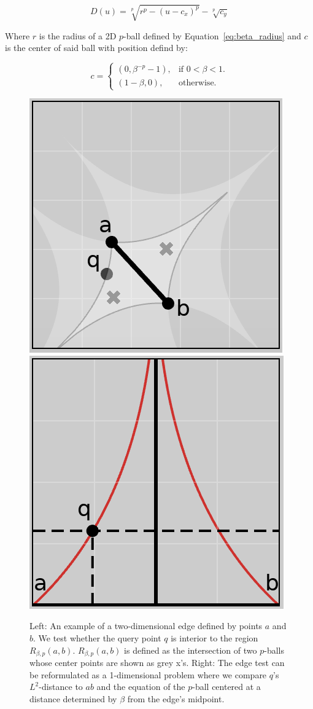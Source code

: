 \begin{equation}
    \label{eq:beta_parameterization}
    D(u) = \sqrt[p]{r^{p} - (u - c_x)^p} - \sqrt[p]{c_y}
\end{equation}

Where $r$ is the radius of a 2D $p$-ball defined by Equation~\ref{eq:beta_radius} and $c$ is the center of said ball with position defind by:

\begin{equation}
    c =
    \begin{cases}
        \left(0, \beta^{-p} - 1\right), & \text{if $0 < \beta < 1$}.\\
       \left(1-\beta, 0\right), & \text{otherwise}.
    \end{cases}
\end{equation}

\begin{figure}
    \includegraphics[width=0.48\linewidth]{figs/chap7/bskeleton.png}
    \includegraphics[width=0.48\linewidth]{figs/chap7/bskeletonParameter.png}
    \caption{Left: An example of a two-dimensional edge defined by points $a$ and $b$.
    We test whether the query point $q$ is interior to the region $R_{\beta,p}(a,b)$.
    $R_{\beta,p}(a,b)$ is defined as the intersection of two $p$-balls whose center points are shown as grey x's.
    Right: The edge test can be reformulated as a 1-dimensional problem where we compare $q$'s $L^2$-distance to $ab$ and the equation of the $p$-ball centered at a distance determined by $\beta$ from the edge's midpoint.}
    \label{fig:gabriel_p_shapes}
\end{figure}

